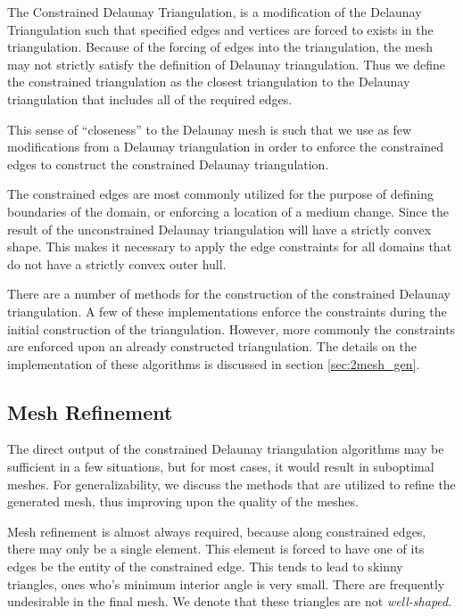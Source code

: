 \documentclass[../fem.tex]{subfile}
\begin{document}
The Constrained Delaunay Triangulation, is a modification of the Delaunay
Triangulation such that specified edges and vertices are forced to exists in
the triangulation. Because of the forcing of edges into the triangulation, the
mesh may not strictly satisfy the definition of Delaunay triangulation. Thus we
define the constrained triangulation as the closest triangulation to the
Delaunay triangulation that includes all of the required edges.

This sense of ``closeness'' to the Delaunay mesh is such that we use as few
modifications from a Delaunay triangulation in order to enforce the constrained
edges to construct the constrained Delaunay triangulation.

The constrained edges are most commonly utilized for the purpose of defining
boundaries of the domain, or enforcing a location of a medium change. Since the
result of the unconstrained Delaunay triangulation will have a strictly convex
shape. This makes it necessary to apply the edge constraints for all domains
that do not have a strictly convex outer hull.

There are a number of methods for the construction of the constrained Delaunay
triangulation. A few of these implementations enforce the constraints during
the initial construction of the triangulation. However, more commonly the
constraints are enforced upon an already constructed triangulation. The details
on the implementation of these algorithms is discussed in section
\ref{sec:2mesh_gen}.

\subsection{Mesh Refinement}%
\label{sub:mesh_refinement}

The direct output of the constrained Delaunay triangulation algorithms may be
sufficient in a few situations, but for most cases, it would result in
suboptimal meshes. For generalizability, we discuss the methods that are utilized
to refine the generated mesh, thus improving upon the quality of the meshes.

Mesh refinement is almost always required, because along constrained edges,
there may only be a single element. This element is forced to have one of its
edges be the entity of the constrained edge. This tends to lead to skinny
triangles, ones who's minimum interior angle is very small. There are frequently
undesirable in the final mesh. We denote that these triangles are not
\textit{well-shaped}.
\end{document}
